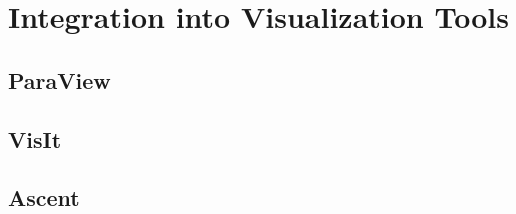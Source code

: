 \section{Integration into Visualization Tools}

\subsection{ParaView}


\subsection{VisIt}


\subsection{Ascent}

